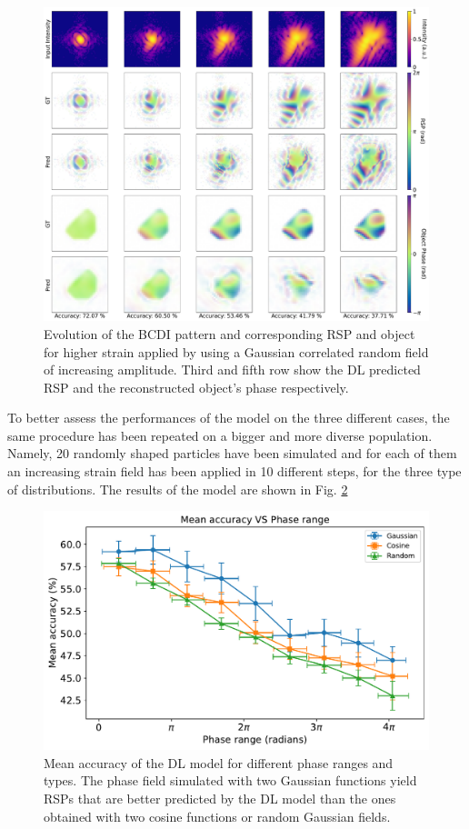 \begin{figure}[H]
    \centering
    \includegraphics[width=\textwidth]{figures/Phasing/performance_random.pdf}
    \caption{Evolution of the BCDI pattern and corresponding RSP and object for higher strain applied by using a Gaussian
    correlated random field of increasing amplitude. Third and fifth row show the DL predicted RSP and the reconstructed 
    object's phase respectively. }
    \label{fig:random1}
\end{figure}

To better assess the performances of the model on the three different cases, the same procedure has been repeated on a 
bigger and more diverse population. Namely, 20 randomly shaped particles have been simulated and for each of them an 
increasing strain field has been applied in 10 different steps, for the three type of distributions. The results of 
the model are shown in Fig. \ref{fig:compa_all}

\begin{figure}[H]
    \centering
    \includegraphics[width=\textwidth]{figures/Phasing/plot_acc_comp_allFINAL.pdf}
    \caption{Mean accuracy of the DL model for different phase ranges and types. The phase field simulated with two Gaussian 
    functions yield RSPs that are better predicted by the DL model than the ones obtained with two cosine functions or 
    random Gaussian fields. }
    \label{fig:compa_all}
\end{figure}

